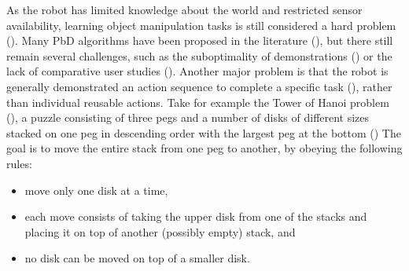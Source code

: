As the robot has limited knowledge about the world and restricted sensor availability, learning object manipulation tasks is still considered a hard problem (\cite{ekvall2008robot}).
Many PbD algorithms have been proposed in the literature (\cite{argall2009survey,billing2010formalism}), but there still remain several challenges, such as the suboptimality of demonstrations (\cite{chen2003programing,kaiser1995obtaining}) or the lack of comparative user studies (\cite{suay2012practical}).
Another major problem is that the robot is generally demonstrated an action sequence to complete a specific task (\cite{orendt2016robot,peppoloni2014ros}), rather than individual reusable actions.
Take for example the Tower of Hanoi problem (\cite{douglas1985metamagical}), a puzzle consisting of three pegs and a number of disks of different sizes stacked on one peg in descending order with the largest peg at the bottom ()
The goal is to move the entire stack from one peg to another, by obeying the following rules: %
\begin{itemize}
\item move only one disk at a time,
\item each move consists of taking the upper disk from one of the stacks and placing it on top of another (possibly empty) stack, and
\item no disk can be moved on top of a smaller disk.
\end{itemize}

